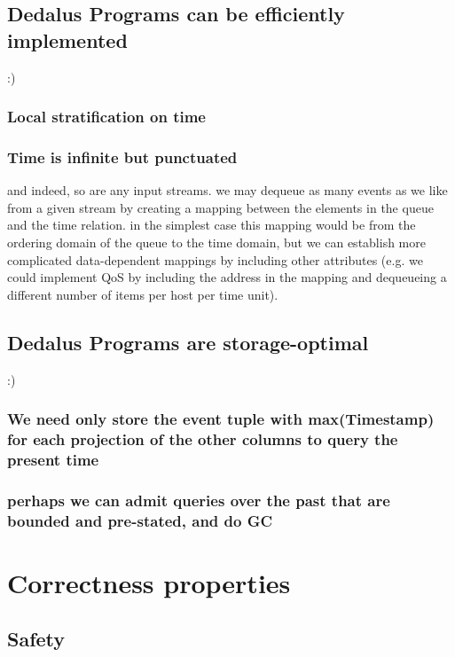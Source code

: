 \documentclass{acm_proc_article-sp-sigmod09}
\begin{document}
\subsection{Dedalus Programs can be efficiently implemented}

:)

\subsubsection{Local stratification on time}

\subsubsection{Time is infinite but punctuated}

and indeed, so are any input streams.  we may dequeue as many events as we like from a given stream by creating a mapping
between the elements in the queue and the time relation.  in the simplest case this mapping would be from the ordering domain 
of the queue to the time domain, but we can establish more complicated data-dependent mappings by including other attributes 
(e.g. we could implement QoS by including the address in the mapping and dequeueing a different number of items per host
per time unit).

\subsection{Dedalus Programs are storage-optimal}

:)

\subsubsection{We need only store the event tuple with max(Timestamp) for each projection of the other columns to query the present time}


\subsubsection{perhaps we can admit queries over the past that are bounded and pre-stated, and do GC}

\section{Correctness properties}

\subsection{Safety}
\end{document}
